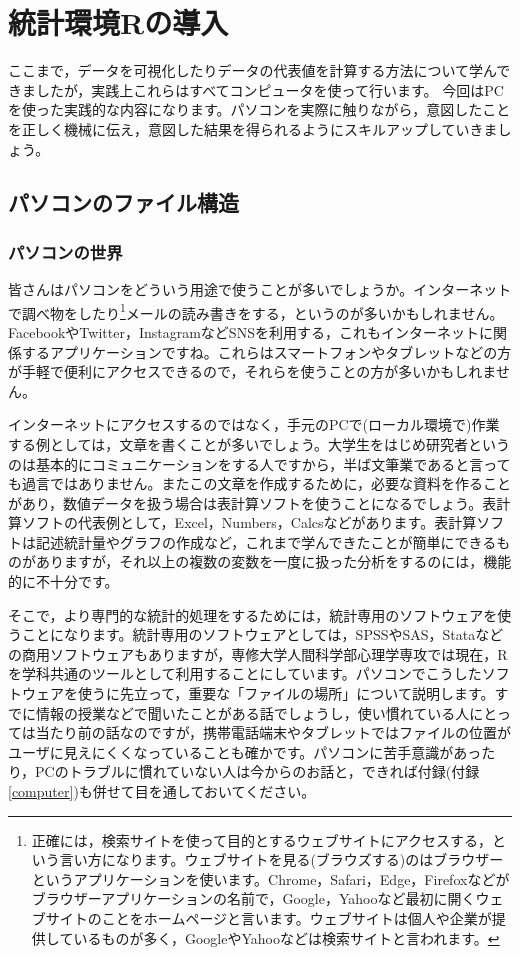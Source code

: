 \documentclass{ltjsbook}
\begin{document}
\VerbatimFootnotes
\chapter{統計環境Rの導入}
\label{m03_introR}
ここまで，データを可視化したりデータの代表値を計算する方法について学んできましたが，実践上これらはすべてコンピュータを使って行います。
今回はPCを使った実践的な内容になります。パソコンを実際に触りながら，意図したことを正しく機械に伝え，意図した結果を得られるようにスキルアップしていきましょう。

\section{パソコンのファイル構造}
\subsection{パソコンの世界}
皆さんはパソコンをどういう用途で使うことが多いでしょうか。インターネットで調べ物をしたり\footnote{正確には，検索サイトを使って目的とするウェブサイトにアクセスする，という言い方になります。ウェブサイトを見る(ブラウズする)のはブラウザーというアプリケーションを使います。Chrome，Safari，Edge，Firefoxなどがブラウザーアプリケーションの名前で，Google，Yahooなど最初に開くウェブサイトのことをホームページと言います。ウェブサイトは個人や企業が提供しているものが多く，GoogleやYahooなどは検索サイトと言われます。}メールの読み書きをする，というのが多いかもしれません。FacebookやTwitter，InstagramなどSNSを利用する，これもインターネットに関係するアプリケーションですね。これらはスマートフォンやタブレットなどの方が手軽で便利にアクセスできるので，それらを使うことの方が多いかもしれません。

インターネットにアクセスするのではなく，手元のPCで(ローカル環境で)作業する例としては，文章を書くことが多いでしょう。大学生をはじめ研究者というのは基本的にコミュニケーションをする人ですから，半ば文筆業であると言っても過言ではありません。またこの文章を作成するために，必要な資料を作ることがあり，数値データを扱う場合は表計算ソフトを使うことになるでしょう。表計算ソフトの代表例として，Excel，Numbers，Calcsなどがあります。表計算ソフトは記述統計量やグラフの作成など，これまで学んできたことが簡単にできるものがありますが，それ以上の複数の変数を一度に扱った分析をするのには，機能的に不十分です。

そこで，より専門的な統計的処理をするためには，統計専用のソフトウェアを使うことになります。統計専用のソフトウェアとしては，SPSSやSAS，Stataなどの商用ソフトウェアもありますが，専修大学人間科学部心理学専攻では現在，Rを学科共通のツールとして利用することにしています。パソコンでこうしたソフトウェアを使うに先立って，重要な「ファイルの場所」について説明します。すでに情報の授業などで聞いたことがある話でしょうし，使い慣れている人にとっては当たり前の話なのですが，携帯電話端末やタブレットではファイルの位置がユーザに見えにくくなっていることも確かです。パソコンに苦手意識があったり，PCのトラブルに慣れていない人は今からのお話と，できれば付録(付録\ref{computer})も併せて目を通しておいてください。
\end{document}
